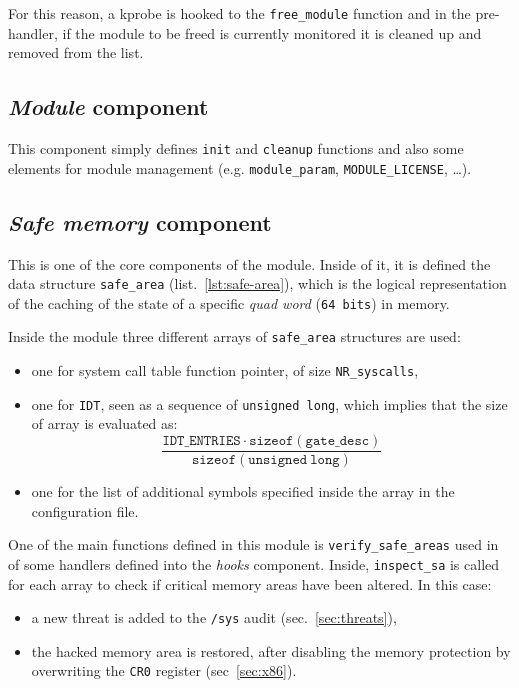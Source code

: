 \documentclass{article}
\begin{document}
	For this reason, a kprobe is hooked to the \texttt{free\_module} function and in the pre-handler, if the
	module to be freed is currently monitored it is cleaned up and removed from the list.

	\subsection{\emph{Module} component}\label{sec:module}
	This component simply defines \texttt{init} and \texttt{cleanup} functions and also some elements for module
	management (e.g. \texttt{module\_param}, \texttt{MODULE\_LICENSE}, \dots).

	\subsection{\emph{Safe memory} component}\label{sec:safemem}
	This is one of the core components of the module. Inside of it, it is defined the data structure
	\texttt{safe\_area} (list.~\ref{lst:safe-area}), which is the logical representation of the caching of the state of
	a specific \textit{quad word} (\texttt{64 bits}) in memory.

	Inside the module three different arrays of \texttt{safe\_area} structures are used:
	\begin{itemize}
		\item one for system call table function pointer, of size \texttt{NR\_syscalls},
		\item one for \texttt{IDT}, seen as a sequence of \texttt{unsigned long}, which implies that the size of array
		is evaluated as:
		\begin{equation*}
			\dfrac{\mathtt{IDT\_ENTRIES} \cdot \mathtt{sizeof(gate\_desc)}}{\mathtt{sizeof(unsigned\ long)}}
		\end{equation*}
		\item one for the list of additional symbols specified inside the array in the configuration file.
	\end{itemize}

	One of the main functions defined in this module is \texttt{verify\_safe\_areas} used in of some handlers defined
	into the \emph{hooks} component. Inside, \texttt{inspect\_sa} is called for each array to check if
	critical memory areas have been altered. In this case:

	\begin{itemize}
		\item a new threat is added to the \texttt{/sys} audit (sec.~\ref{sec:threats}),
		\item the hacked memory area is restored, after disabling the memory protection by overwriting the \texttt{CR0}
		register (sec~\ref{sec:x86}).
	\end{itemize}
\end{document}
